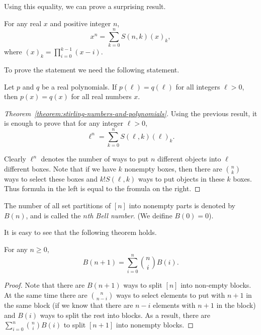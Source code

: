 Using this equality, we can prove a surprising result.
\begin{theorem}
\label{theorem:stirling-numbers-and-polynomials}
  For any real $x$ and positive integer $n$,
  \[
    x^n = \sum_{k = 0}^n S(n, k) (x)_k,
  \]
  where $(x)_k = \prod_{i = 0}^{k - 1} (x - i)$.
\end{theorem}

To prove the statement we need the following statement.
\begin{theorem}
  Let $p$ and $q$ be a real polynomials. If $p(\ell) = q(\ell)$ for all
  integers $\ell > 0$, then $p(x) = q(x)$ for all real numbers $x$.
\end{theorem}

\begin{proof}[Theorem~\ref{theorem:stirling-numbers-and-polynomials}]
  Using the previous result, it is enough to prove that
  for any integer $\ell > 0$,
  \[
    \ell^n = \sum_{k = 0}^n S(\ell, k) (\ell)_k.
  \]

  Clearly $\ell^n$ denotes the number of ways to put $n$ different
  objects into $\ell$ different boxes. Note that if we have $k$ nonempty
  boxes, then there are $\binom{n}{k}$ ways to select these boxes and
  $k! S(\ell, k)$ ways to put objects in these $k$ boxes. Thus formula in
  the left is equal to the fromula on the right.
\end{proof}

\begin{definition}
  The number of all set partitions of $[n]$ into nonempty parts
  is denoted by $B(n)$, and is called the \emph{$n$th Bell number}.
  (We deifine $B(0) = 0$).
\end{definition}


It is easy to see that the following theorem holds.
\begin{theorem}
  For any $n \ge 0$,
  \[
    B(n + 1) = \sum_{i = 0}^n \binom{n}{i} B(i).
  \]
\end{theorem}
\begin{proof}
  Note that there are $B(n + 1)$ ways to split $[n]$ into
  non-empty blocks. At the same time there are $\binom{n}{n - i}$
  ways to select elements to put with $n + 1$ in the same block
  (if we know that there are $n - i$ elements with $n + 1$ in the block)
  and $B(i)$ ways to split the rest into blocks. As a result,
  there are $\sum_{i = 0}^n \binom{n}{i} B(i)$ to split $[n + 1]$
  into nonempty blocks.
\end{proof}

